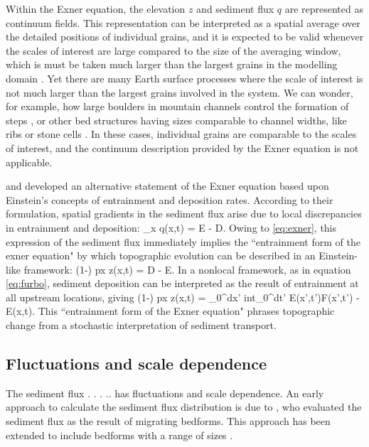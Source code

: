 Within the Exner equation, the elevation $z$ and sediment flux $q$ are represented as continuum fields. This representation can be interpreted as a spatial average over the detailed positions of individual grains, and it is expected to be valid whenever the scales of interest are large compared to the size of the averaging window, which is must be taken much larger than the largest grains in the modelling domain \citep{Coleman2009}. 
Yet there are many Earth surface processes where the scale of interest is not much larger than the largest grains involved in the system. We can wonder, for example, how large boulders in mountain channels control the formation of steps \citep{Church2007,Zimmerman2008,Saletti2020}, or other bed structures having sizes comparable to channel widths, like ribs or stone cells \citep{Hassan2008,Venditti2017}. In these cases, individual grains are comparable to the scales of interest, and the continuum description provided by the Exner equation is not applicable.

\citet{Nakawaga1976} and \citet{Tsujimoto1978} developed an alternative statement of the Exner equation based upon Einstein's concepts of entrainment and deposition rates.
According to their formulation, spatial gradients in the sediment flux arise due to local discrepancies in entrainment and deposition:
\be \partial_x q(x,t) = E - D. \ee 
Owing to \ref{eq:exner}, this expression of the sediment flux immediately implies the ``entrainment form of the exner equation" \citep{Parker2000,Furbish2012,Fathel2015,Furbish2017} by which topographic evolution can be described in an Einstein-like framework: 
\be (1-\phi) px z(x,t) = D - E.\ee
In a nonlocal framework, as in equation \ref{eq:furbo}, sediment deposition can be interpreted as the result of entrainment at all upstream locations, giving
\be (1-\phi) px z(x,t) = \int_0^\infty dx' int_0^\infty dt' E(x',t')F(x',t') - E(x,t). \ee
This ``entrainment form of the Exner equation" \citep{Furbish2017} phrases topographic change from a stochastic interpretation of sediment transport.

\subsection{Fluctuations and scale dependence}

The sediment flux . . . .. has fluctuations and scale dependence. 
An early approach to calculate the sediment flux distribution is due to \citet{Hamamori1962}, who evaluated the sediment flux as the result of migrating bedforms. This approach has been extended to include bedforms with a range of sizes \citep{Guala2014,Nikora1984}.


